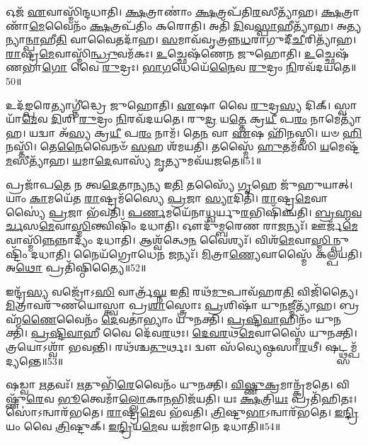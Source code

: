𑌓𑌜᳴ \ul{𑌏}\-𑌵𑌾𑌸𑍍𑌮𑌿᳴𑌨𑍍𑌦𑌧𑌾𑌤𑌿।
\-\ul{𑌕𑍍𑌷}\-𑌤𑍍𑌰𑌾𑌣𑌾𑌂॑ \ul{𑌕𑍍𑌷}\-𑌤𑍍𑌰𑌪᳴𑌤𑌿\-\ul{𑌰}\-𑌸𑍀𑌤𑍍𑌯𑌾᳴𑌹।
\-\ul{𑌕𑍍𑌷}\-𑌤𑍍𑌰𑌾𑌣𑌾᳴\-\ul{𑌮𑍇}\-𑌵𑍈𑌨𑌂᳴ \ul{𑌕𑍍𑌷}\-𑌤𑍍𑌰𑌪᳴𑌤𑌿𑌂 𑌕𑌰𑍋𑌤𑌿।
𑌅𑌤𑌿᳴ \ul{𑌦𑌿}\-𑌵\-\ul{𑌸𑍍𑌪𑌾}\-𑌹𑍀𑌤𑍍𑌯𑌾᳴𑌹।
𑌅\-\ul{𑌤𑍍𑌯}\-𑌨𑍍𑌯𑌾\-\ul{𑌨𑍍𑌪𑌾}\-𑌹𑍀\-\ul{𑌤𑌿} 𑌵𑌾𑌵𑍈𑌤𑌦𑌾᳴𑌹।
\-\ul{𑌸}\-𑌮𑌾𑌵᳴𑌵𑍃𑌤𑍍𑌰𑌨𑍍𑌨\-\ul{𑌧}\-𑌰𑌾𑌗𑍁𑌦𑍀᳴\-\ul{𑌚𑍀}\-\-𑌰𑌿𑌤𑍍𑌯𑌾᳴𑌹।
\-\ul{𑌰𑌾}\-𑌷𑍍𑌟𑍍𑌰\-\ul{𑌮𑍇}\-𑌵𑌾𑌸𑍍𑌮𑌿᳴\-\ul{𑌨𑍍𑌧𑍍𑌰𑍁}\-𑌵𑌮᳴𑌕𑌃।
\-\ul{𑌉}\-𑌚𑍍𑌛𑍇𑌷᳴𑌣𑍇𑌨 𑌜𑍁𑌹𑍋𑌤𑌿।
\-\ul{𑌉}\-𑌚𑍍𑌛𑍇𑌷᳴𑌣𑌭𑌾\-\ul{𑌗𑍋} 𑌵𑍈 \ul{𑌰𑍁}\-𑌦𑍍𑌰𑌃।
\-\ul{𑌭𑌾}\-\-\ul{𑌗}\-𑌧𑍇𑌯𑍇᳴\-\ul{𑌨𑍈}\-𑌵 \ul{𑌰𑍁}\-𑌦𑍍𑌰𑌂 \ul{𑌨𑌿}\-𑌰𑌵᳴𑌦𑌯𑌤𑍇॥50॥

𑌉𑌦᳴\-\ul{𑌙𑍍𑌪}\-𑌰𑍇𑌤𑍍𑌯𑌾𑌗𑍍𑌨𑍀॑𑌦𑍍𑌧𑍍𑌰𑍇 𑌜𑍁𑌹𑍋𑌤𑌿।
\-\ul{𑌏}\-𑌷𑌾 𑌵𑍈 \ul{𑌰𑍁}\-𑌦𑍍𑌰\-\ul{𑌸𑍍𑌯} 𑌦𑌿𑌕𑍍।
𑌸𑍍𑌵𑌾𑌯𑌾᳴\-\ul{𑌮𑍇}\-𑌵 \ul{𑌦𑌿}\-𑌶𑌿 \ul{𑌰𑍁}\-𑌦𑍍𑌰𑌂 \ul{𑌨𑌿}\-𑌰𑌵᳴𑌦𑌯𑌤𑍇।
𑌰𑍁\-\ul{𑌦𑍍𑌰} 𑌯\-\ul{𑌤𑍍𑌤𑍇} 𑌕𑍍𑌰\-\ul{𑌯𑍀} 𑌪\-\ul{𑌰𑌂} 𑌨𑌾𑌮𑍇𑌤𑍍𑌯𑌾᳴𑌹।
𑌯𑌦𑍍𑌵𑌾 𑌅᳴\-\ul{𑌸𑍍𑌯} 𑌕𑍍𑌰\-\ul{𑌯𑍀} 𑌪\-\ul{𑌰𑌂} 𑌨𑌾𑌮᳴।
𑌤𑍇\-\ul{𑌨} 𑌵𑌾 \ul{𑌏}\-𑌷 𑌹𑌿᳴𑌨𑌸𑍍𑌤𑌿।
𑌯𑍞 \ul{𑌹𑌿}\-𑌨𑌸𑍍𑌤𑌿᳴।
𑌤𑍇\-\ul{𑌨𑍈}\-𑌵𑍈𑌨𑍞᳴ \ul{𑌸}\-𑌹 𑌶᳴𑌮𑌯𑌤𑌿।
𑌤𑌸𑍍𑌮𑍈᳴ \ul{𑌹𑍁}\-𑌤𑌮᳴𑌸𑌿 \ul{𑌯}\-𑌮𑍇𑌷𑍍𑌟᳴\-\ul{𑌮}\-𑌸𑍀𑌤𑍍𑌯𑌾᳴𑌹।
\-\ul{𑌯}\-𑌮𑌾\-\ul{𑌦𑍇}\-𑌵𑌾𑌸𑍍𑌯᳴ \ul{𑌮𑍃}\-𑌤𑍍𑌯𑍁𑌮𑌵᳴𑌯𑌜𑌤𑍇॥51॥

𑌪𑍍𑌰𑌜𑌾᳴𑌪\-\ul{𑌤𑍇} 𑌨 𑌤𑍍𑌵\-\ul{𑌦𑍇}\-𑌤𑌾\-\ul{𑌨𑍍𑌯}\-𑌨𑍍𑌯 𑌇\-\ul{𑌤𑌿} 𑌤𑌸𑍍𑌯𑍈᳴ \ul{𑌗𑍃}\-𑌹𑍇 𑌜𑍁᳴𑌹𑍁𑌯𑌾𑌤𑍍।
𑌯𑌾𑌂 \ul{𑌕𑌾}\-𑌮𑌯𑍇᳴𑌤 \ul{𑌰𑌾}\-𑌷𑍍𑌟𑍍𑌰𑌮᳴𑌸𑍍𑌯𑍈 \ul{𑌪𑍍𑌰}\-𑌜𑌾 \ul{𑌸𑍍𑌯𑌾}\-𑌦𑌿𑌤𑌿᳴।
\-\ul{𑌰𑌾}\-𑌷𑍍𑌟𑍍𑌰\-\ul{𑌮𑍇}\-𑌵𑌾𑌸𑍍𑌯𑍈॑ \ul{𑌪𑍍𑌰}\-𑌜𑌾 𑌭᳴𑌵𑌤𑌿।
\-\ul{𑌪}\-\-\ul{𑌰𑍍𑌣}\-𑌮𑌯𑍇᳴𑌨𑌾\-\ul{𑌧𑍍𑌵}\-𑌰𑍍𑌯𑍁\-\ul{𑌰}\-𑌭𑌿𑌷𑌿᳴𑌞𑍍𑌚𑌤𑌿।
\-\ul{𑌬𑍍𑌰}\-\-\ul{𑌹𑍍𑌮}\-\-\ul{𑌵}\-\-\ul{𑌰𑍍𑌚}\-𑌸\-\ul{𑌮𑍇}\-𑌵𑌾\-\-\ul{𑌸𑍍𑌮𑌿}\-𑌨𑍍𑌤𑍍𑌵𑌿𑌷𑌿𑌂᳴ 𑌦𑌧𑌾𑌤𑌿।
𑌔𑌦𑍁᳴𑌮𑍍𑌬𑌰𑍇𑌣 𑌰𑌾\-\ul{𑌜}\-𑌨𑍍𑌯𑌃᳴।
𑌊𑌰𑍍𑌜᳴\-\ul{𑌮𑍇}\-𑌵𑌾\-𑌸𑍍𑌮𑌿᳴\-\ul{𑌨𑍍𑌨}\-𑌨𑍍𑌨𑌾𑌦𑍍𑌯𑌂᳴ 𑌦𑌧𑌾𑌤𑌿।
𑌆𑌶𑍍𑌵᳴𑌤𑍍𑌥𑍇\-\ul{𑌨} 𑌵𑍈𑌶𑍍𑌯𑌃᳴।
𑌵𑌿𑌶᳴\-\ul{𑌮𑍇}\-𑌵𑌾\-\ul{𑌸𑍍𑌮𑌿}\-𑌨𑍍𑌪𑍁𑌷𑍍𑌟𑌿𑌂᳴ 𑌦𑌧𑌾𑌤𑌿।
𑌨𑍈𑌯᳴𑌗𑍍𑌰𑍋𑌧𑍇\-\ul{𑌨} 𑌜𑌨𑍍𑌯𑌃᳴।
\-\ul{𑌮𑌿}\-𑌤𑍍𑌰𑌾\-\ul{𑌣𑍍𑌯𑍇}\-𑌵𑌾𑌸𑍍𑌮𑍈᳴ 𑌕𑌲𑍍𑌪𑌯𑌤𑌿।
𑌅\-\ul{𑌥𑍋} 𑌪𑍍𑌰𑌤𑌿᳴\-𑌷𑍍𑌠𑌿𑌤𑍍𑌯𑍈॥52॥\anuvakamend[\-\ul{𑌭}\-\-\ul{𑌵}\-\-\ul{𑌤𑍍𑌯𑌾}\-\-\ul{𑌹𑍁𑌃} 𑌪𑍁𑌰𑍁᳴\-\ul{𑌷} 𑌓\-\ul{𑌜}\-𑌸𑍇𑌤𑍍𑌯𑌾᳴𑌹 \ul{𑌨𑌿}\-𑌰𑌵᳴𑌦𑌯𑌤𑍇 𑌯𑌜\-\ul{𑌤𑍇} 𑌜\-\ul{𑌨𑍍𑌯𑍋} 𑌦𑍍𑌵𑍇 𑌚᳴]

𑌇𑌨𑍍𑌦𑍍𑌰᳴\-\ul{𑌸𑍍𑌯} 𑌵𑌜𑍍𑌰𑍋᳴𑌽\-\ul{𑌸𑌿} 𑌵𑌾𑌰𑍍𑌤𑍍𑌰᳴\-\ul{𑌘𑍍𑌨} 𑌇\-\ul{𑌤𑌿} 𑌰𑌥᳴\-\ul{𑌮𑍁}\-𑌪𑌾𑌵᳴𑌹𑌰\-\ul{𑌤𑌿} 𑌵𑌿𑌜𑌿᳴𑌤𑍍𑌯𑍈।
\-\ul{𑌮𑌿}\-𑌤𑍍𑌰𑌾𑌵𑌰𑍁᳴𑌣𑌯𑍋𑌸𑍍𑌤𑍍𑌵𑌾 𑌪𑍍𑌰\-\ul{𑌶𑌾}\-𑌸𑍍𑌤𑍍𑌰𑍋𑌃 \ul{𑌪𑍍𑌰}\-𑌶𑌿𑌷𑌾᳴ 𑌯𑍁\-\ul{𑌨}\-𑌜𑍍𑌮𑍀𑌤𑍍𑌯𑌾᳴𑌹।
𑌬𑍍𑌰𑌹𑍍𑌮᳴\-\ul{𑌣𑍈}\-𑌵𑍈𑌨𑌂᳴ \ul{𑌦𑍇}\-𑌵𑌤𑌾॑𑌭𑍍𑌯𑌾𑌂 𑌯𑍁𑌨𑌕𑍍𑌤𑌿।
\-\ul{𑌪𑍍𑌰}\-\-\ul{𑌷𑍍𑌟𑌿}\-\-\ul{𑌵𑌾}\-𑌹𑌿𑌨𑌂᳴ 𑌯𑍁𑌨𑌕𑍍𑌤𑌿।
\-\ul{𑌪𑍍𑌰}\-\-\ul{𑌷𑍍𑌟𑌿}\-\-\ul{𑌵𑌾}\-𑌹𑍀 𑌵𑍈 𑌦𑍇᳴𑌵\-\ul{𑌰}\-𑌥𑌃।
\-\ul{𑌦𑍇}\-\-\ul{𑌵}\-\-\ul{𑌰}\-𑌥\-\ul{𑌮𑍇}\-𑌵𑌾𑌸𑍍𑌮𑍈᳴ 𑌯𑍁𑌨𑌕𑍍𑌤𑌿।
𑌤𑍍𑌰𑌯𑍋\-𑌽𑌶𑍍𑌵𑌾᳴ 𑌭𑌵𑌨𑍍𑌤𑌿।
𑌰𑌥᳴𑌶𑍍𑌚\-\ul{𑌤𑍁}\-𑌰𑍍𑌥𑌃।
𑌦𑍍𑌵𑍗 𑌸᳴𑌵𑍍𑌯𑍇𑌷𑍍𑌠𑌸𑌾\-\ul{𑌰}\-𑌥𑍀।
𑌷𑌟𑍍𑌥𑍍𑌸𑌮𑍍𑌪᳴𑌦𑍍𑌯𑌨𑍍𑌤𑍇॥53॥

𑌷𑌡𑍍𑌵𑌾 \ul{𑌋}\-𑌤𑌵𑌃᳴।
\-\ul{𑌋}\-𑌤𑍁𑌭𑌿᳴\-\ul{𑌰𑍇}\-𑌵𑍈𑌨𑌂᳴ 𑌯𑍁𑌨𑌕𑍍𑌤𑌿।
\-\ul{𑌵𑌿}\-\-\ul{𑌷𑍍𑌣𑍁}\-\-\ul{𑌕𑍍𑌰}\-𑌮𑌾𑌨𑍍𑌕𑍍𑌰᳴𑌮𑌤𑍇।
𑌵𑌿𑌷𑍍𑌣𑍁᳴\-\ul{𑌰𑍇}\-𑌵 \ul{𑌭𑍂}\-𑌤𑍍𑌵𑍇𑌮𑌾𑌁\-\ul{𑌲𑍍𑌲𑍋}\-𑌕𑌾\-\ul{𑌨}\-𑌭𑌿𑌜᳴𑌯𑌤𑌿।
𑌯𑌃 \ul{𑌕𑍍𑌷}\-𑌤𑍍𑌰𑌿\-\ul{𑌯𑌃} 𑌪𑍍𑌰𑌤𑌿᳴\-𑌹𑌿𑌤𑌃।
𑌸𑍋॑𑌽𑌨𑍍𑌵𑌾𑌰᳴𑌭𑌤𑍇।
\-\ul{𑌰𑌾}\-𑌷𑍍𑌟𑍍𑌰\-\ul{𑌮𑍇}\-𑌵 𑌭᳴𑌵𑌤𑌿।
\-\ul{𑌤𑍍𑌰𑌿}\-𑌷𑍍𑌟𑍁\-\ul{𑌭𑌾}\-\-𑌽𑌨𑍍𑌵𑌾𑌰᳴𑌭𑌤𑍇।
\-\ul{𑌇}\-\-\ul{𑌨𑍍𑌦𑍍𑌰𑌿}\-𑌯𑌂 𑌵𑍈 \ul{𑌤𑍍𑌰𑌿}\-𑌷𑍍𑌟𑍁𑌕𑍍।
\-\ul{𑌇}\-\-\ul{𑌨𑍍𑌦𑍍𑌰𑌿}\-𑌯\-\ul{𑌮𑍇}\-𑌵 𑌯𑌜᳴𑌮𑌾𑌨𑍇 𑌦𑌧𑌾𑌤𑌿॥54॥

